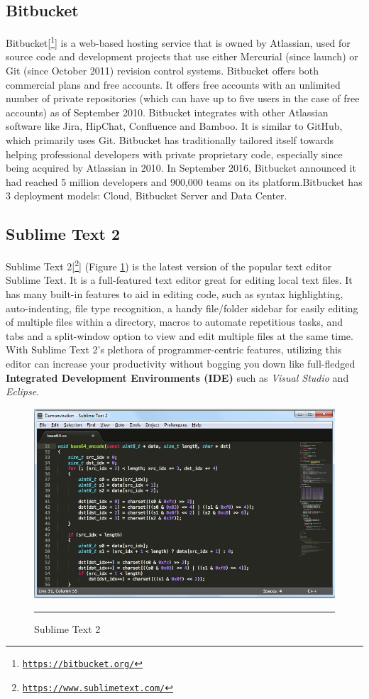 \subsection{Bitbucket}
Bitbucket[\footnote{\href{https://bitbucket.org/}{\texttt{https://bitbucket.org/}}}] is a web-based hosting service that is owned by Atlassian, used for source code and development projects that use either Mercurial (since launch) or Git (since October 2011) revision control systems. Bitbucket offers both commercial plans and free accounts. It offers free accounts with an unlimited number of private repositories (which can have up to five users in the case of free accounts) as of September 2010. Bitbucket integrates with other Atlassian software like Jira, HipChat, Confluence and Bamboo.
It is similar to GitHub, which primarily uses Git. Bitbucket has traditionally tailored itself towards helping professional developers with private proprietary code, especially since being acquired by Atlassian in 2010. In September 2016, Bitbucket announced it had reached 5 million developers and 900,000 teams on its platform.Bitbucket has 3 deployment models: Cloud, Bitbucket Server and Data Center.
\subsection{Sublime Text 2}
Sublime Text 2[\footnote{\href{https://www.sublimetext.com/}{\texttt{https://www.sublimetext.com/}}}] (Figure \ref{fig:sublime}) is the latest version of the popular text editor Sublime Text. It is a full-featured text
editor great for editing local text files. It has many built-in features to aid in editing code, such as
syntax highlighting, auto-indenting, file type recognition, a handy file/folder sidebar for easily
editing of multiple files within a directory, macros to automate repetitious tasks, and tabs and a
split-window option to view and edit multiple files at the same time. With Sublime Text 2's plethora
of programmer-centric features, utilizing this editor can increase your productivity without
bogging you down like full-fledged \textbf{Integrated Development Environments (IDE)} such as \textit{Visual
	Studio} and \textit{Eclipse}. 
\begin{figure}[h!]
	\centering
	\includegraphics[width=1\textwidth]{./images/sublime.jpg}
	\rule{1\textwidth}{1pt}
	\caption{Sublime Text 2}
	\label{fig:sublime}
\end{figure}

